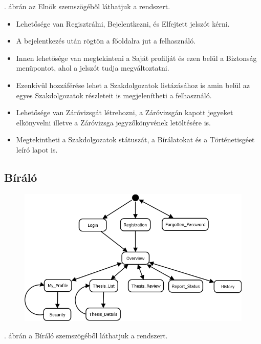 \documentclass[a4paper,12pt]{article}
\begin{document}
. ábrán az Elnök szemszögéből láthatjuk a rendszert. 
\begin{itemize}
	\item Lehetősége van Regisztrálni, Bejelentkezni, és Elfejtett jelszót kérni. 
	\item A bejelentkezés után rögtön a főoldalra jut a felhasználó. 
	\item Innen lehetősége van megtekinteni a Saját profilját és ezen belül a Biztonság menüpontot, ahol a jelszót tudja megváltoztatni. 
	\item Ezenkívül hozzáférése lehet a Szakdolgozatok listázásához is amin belül az egyes Szakdolgozatok részleteit is megjelenítheti a felhasználó. 
	\item Lehetősége van Záróvizsgát létrehozni, a Záróvizsgán kapott jegyeket elkönyvelni illetve a Záróvizsga jegyzőkönyvének letöltésére is. 
	\item Megtekintheti a Szakdolgozatok státuszát, a Bírálatokat és a Történetisgéet leíró lapot is.
\end{itemize}

\subsection{Bíráló}

\begin{figure}
	\centering
	\includegraphics[width=\textwidth]{images/Lapok_kozotti_atmenetek/Biralo.png}
	\caption{}
	\label{fig:Biralo}
\end{figure}

. ábrán a Bíráló szemszögéből láthatjuk a rendszert. 
\end{document}
